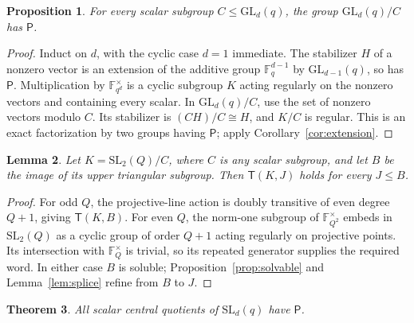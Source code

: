 \documentclass[11pt]{article}
\newtheorem{theorem}{Theorem}[section]
\newtheorem{lemma}[theorem]{Lemma}
\newtheorem{proposition}[theorem]{Proposition}
\theoremstyle{definition}
\newcommand{\F}{\mathbb F}
\newcommand{\Pp}{\mathsf P}
\newcommand{\Tt}{\mathsf T}
\newcommand{\GL}{\mathrm{GL}}
\newcommand{\SL}{\mathrm{SL}}
\begin{document}
\begin{proposition}\label{prop:gl}
For every scalar subgroup $C\le\GL_d(q)$, the group $\GL_d(q)/C$ has $\Pp$.
\end{proposition}
\begin{proof}
Induct on $d$, with the cyclic case $d=1$ immediate. The stabilizer $H$ of a nonzero vector is an extension of the additive group $\F_q^{d-1}$ by $\GL_{d-1}(q)$, so has $\Pp$. Multiplication by $\F_{q^d}^{\times}$ is a cyclic subgroup $K$ acting regularly on the nonzero vectors and containing every scalar. In $\GL_d(q)/C$, use the set of nonzero vectors modulo $C$. Its stabilizer is $(CH)/C\cong H$, and $K/C$ is regular. This is an exact factorization by two groups having $\Pp$; apply Corollary~\ref{cor:extension}.
\end{proof}
\begin{lemma}\label{lem:sl2}
Let $K=\SL_2(Q)/C$, where $C$ is any scalar subgroup, and let $B$ be the image of its upper triangular subgroup. Then $\Tt(K,J)$ holds for every $J\le B$.
\end{lemma}
\begin{proof}
For odd $Q$, the projective-line action is doubly transitive of even degree $Q+1$, giving $\Tt(K,B)$. For even $Q$, the norm-one subgroup of $\F_{Q^2}^{\times}$ embeds in $\SL_2(Q)$ as a cyclic group of order $Q+1$ acting regularly on projective points. Its intersection with $\F_Q^{\times}$ is trivial, so its repeated generator supplies the required word. In either case $B$ is soluble; Proposition~\ref{prop:solvable} and Lemma~\ref{lem:splice} refine from $B$ to $J$.
\end{proof}
\begin{theorem}\label{thm:sl}
All scalar central quotients of $\SL_d(q)$ have $\Pp$.
\end{theorem}
\end{document}
